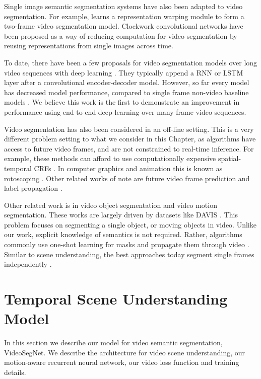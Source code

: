 Single image semantic segmentation systems have also been adapted to video segmentation. For example, \citep{gadde2017semantic} learns a representation warping module to form a two-frame video segmentation model. Clockwork convolutional networks \citep{shelhamer2016clockwork} have been proposed as a way of reducing computation for video segmentation by reusing representations from single images across time.

To date, there have been a few proposals for video segmentation models over long video sequences with deep learning \citep{patraucean2015spatio,valipour2017recurrent}. They typically append a RNN or LSTM layer after a convolutional encoder-decoder model. However, so far every model has decreased model performance, compared to single frame non-video baseline models \citep{patraucean2015spatio,valipour2017recurrent}. We believe this work is the first to demonstrate an improvement in performance using end-to-end deep learning over many-frame video sequences.

Video segmentation has also been considered in an off-line setting. This is a very different problem setting to what we consider in this Chapter, as algorithms have access to future video frames, and are not constrained to real-time inference. For example, these methods can afford to use computationally expensive spatial-temporal CRFs \citep{kundu2016feature}. In computer graphics and animation this is known as rotoscoping \citep{miksik2017roam}. Other related works of note are future video frame prediction \citep{luc2017predicting} and label propagation \citep{budvytis2010label}.

Other related work is in video object segmentation and video motion segmentation. These works are largely driven by datasets like DAVIS \citep{Perazzi2016}. This problem focuses on segmenting a single object, or moving objects \citep{tokmakov2017learning,vertens2017smsnet} in video. Unlike our work, explicit knowledge of semantics is not required. Rather, algorithms commonly use one-shot learning for masks and propagate them through video \citep{voigtlaender17BMVC}. Similar to scene understanding, the best approaches today segment single frames independently \citep{caelles2017one,khoreva2016learning}.

\section{Temporal Scene Understanding Model}

In this section we describe our model for video semantic segmentation, VideoSegNet. We describe the architecture for video scene understanding, our motion-aware recurrent neural network, our video loss function and training details.

